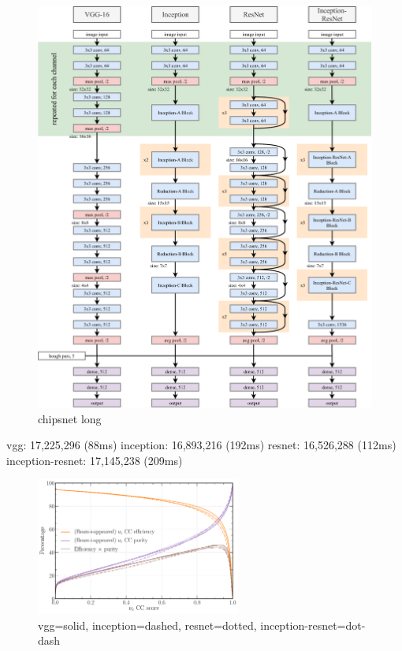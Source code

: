 \begin{figure} %
    \includegraphics[width=\textwidth]{diagrams/7-cvn/chipsnet.pdf}
    \caption[chipsnet short]
    {chipsnet long}
    \label{fig:chipsnet}
\end{figure}

vgg: 17,225,296 (88ms)
inception: 16,893,216 (192ms)
resnet: 16,526,288 (112ms)
inception-resnet: 17,145,238 (209ms)

\begin{figure} %
    \includegraphics[width=0.6\textwidth]{diagrams/7-cvn/chipsnet/arch_nuel_eff_curves.pdf}
    \caption[arch nuel eff curves short]
    {vgg=solid, inception=dashed, resnet=dotted, inception-resnet=dot-dash}
    \label{fig:arch_nuel_eff_curves}
\end{figure}

